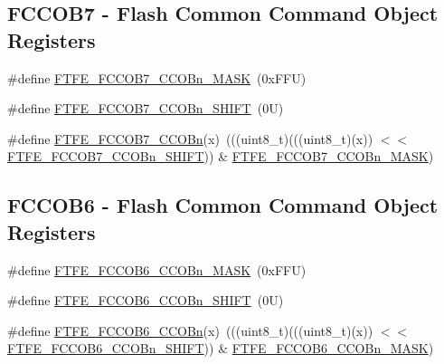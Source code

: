 \subsection*{F\+C\+C\+O\+B7 -\/ Flash Common Command Object Registers}
\begin{DoxyCompactItemize}
\item 
\#define \mbox{\hyperlink{group___f_t_f_e___register___masks_ga6f03287a2909b3e7fa73cc115291fec7}{F\+T\+F\+E\+\_\+\+F\+C\+C\+O\+B7\+\_\+\+C\+C\+O\+Bn\+\_\+\+M\+A\+SK}}~(0x\+F\+F\+U)
\item 
\#define \mbox{\hyperlink{group___f_t_f_e___register___masks_ga4b685969e78b9b85e14c8bf4561daf21}{F\+T\+F\+E\+\_\+\+F\+C\+C\+O\+B7\+\_\+\+C\+C\+O\+Bn\+\_\+\+S\+H\+I\+FT}}~(0\+U)
\item 
\#define \mbox{\hyperlink{group___f_t_f_e___register___masks_ga842ed7bdaf4e63c178972f9687e478d5}{F\+T\+F\+E\+\_\+\+F\+C\+C\+O\+B7\+\_\+\+C\+C\+O\+Bn}}(x)~(((uint8\+\_\+t)(((uint8\+\_\+t)(x)) $<$$<$ \mbox{\hyperlink{group___f_t_f_e___register___masks_ga4b685969e78b9b85e14c8bf4561daf21}{F\+T\+F\+E\+\_\+\+F\+C\+C\+O\+B7\+\_\+\+C\+C\+O\+Bn\+\_\+\+S\+H\+I\+FT}})) \& \mbox{\hyperlink{group___f_t_f_e___register___masks_ga6f03287a2909b3e7fa73cc115291fec7}{F\+T\+F\+E\+\_\+\+F\+C\+C\+O\+B7\+\_\+\+C\+C\+O\+Bn\+\_\+\+M\+A\+SK}})
\end{DoxyCompactItemize}
\subsection*{F\+C\+C\+O\+B6 -\/ Flash Common Command Object Registers}
\begin{DoxyCompactItemize}
\item 
\#define \mbox{\hyperlink{group___f_t_f_e___register___masks_ga5143a0f11e338ce6e900d67a58e9ce55}{F\+T\+F\+E\+\_\+\+F\+C\+C\+O\+B6\+\_\+\+C\+C\+O\+Bn\+\_\+\+M\+A\+SK}}~(0x\+F\+F\+U)
\item 
\#define \mbox{\hyperlink{group___f_t_f_e___register___masks_ga5271e588fb67a85b91f350cd6e15e3d4}{F\+T\+F\+E\+\_\+\+F\+C\+C\+O\+B6\+\_\+\+C\+C\+O\+Bn\+\_\+\+S\+H\+I\+FT}}~(0\+U)
\item 
\#define \mbox{\hyperlink{group___f_t_f_e___register___masks_gaea3983b4c268847e9faa7badeb8096ef}{F\+T\+F\+E\+\_\+\+F\+C\+C\+O\+B6\+\_\+\+C\+C\+O\+Bn}}(x)~(((uint8\+\_\+t)(((uint8\+\_\+t)(x)) $<$$<$ \mbox{\hyperlink{group___f_t_f_e___register___masks_ga5271e588fb67a85b91f350cd6e15e3d4}{F\+T\+F\+E\+\_\+\+F\+C\+C\+O\+B6\+\_\+\+C\+C\+O\+Bn\+\_\+\+S\+H\+I\+FT}})) \& \mbox{\hyperlink{group___f_t_f_e___register___masks_ga5143a0f11e338ce6e900d67a58e9ce55}{F\+T\+F\+E\+\_\+\+F\+C\+C\+O\+B6\+\_\+\+C\+C\+O\+Bn\+\_\+\+M\+A\+SK}})
\end{DoxyCompactItemize}
